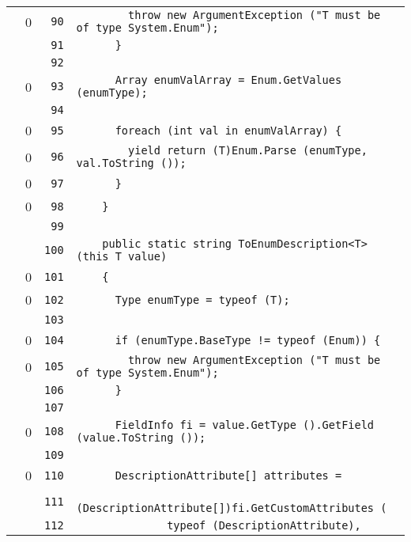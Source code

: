 \documentclass[a4paper,10pt]{article}
\begin{document}
\begin{longtable}[l]{lrrl}
\cellcolor{red} & 0 & \verb~90~ & \verb~        throw new ArgumentException ("T must be of type System.Enum");~\\
\cellcolor{gray} &  & \verb~91~ & \verb~      }~\\
\cellcolor{gray} &  & \verb~92~ & \verb~~\\
\cellcolor{red} & 0 & \verb~93~ & \verb~      Array enumValArray = Enum.GetValues (enumType);~\\
\cellcolor{gray} &  & \verb~94~ & \verb~~\\
\cellcolor{red} & 0 & \verb~95~ & \verb~      foreach (int val in enumValArray) {~\\
\cellcolor{red} & 0 & \verb~96~ & \verb~        yield return (T)Enum.Parse (enumType, val.ToString ());~\\
\cellcolor{red} & 0 & \verb~97~ & \verb~      }~\\
\cellcolor{red} & 0 & \verb~98~ & \verb~    }~\\
\cellcolor{gray} &  & \verb~99~ & \verb~~\\
\cellcolor{gray} &  & \verb~100~ & \verb~    public static string ToEnumDescription<T> (this T value)~\\
\cellcolor{red} & 0 & \verb~101~ & \verb~    {~\\
\cellcolor{red} & 0 & \verb~102~ & \verb~      Type enumType = typeof (T);~\\
\cellcolor{gray} &  & \verb~103~ & \verb~~\\
\cellcolor{red} & 0 & \verb~104~ & \verb~      if (enumType.BaseType != typeof (Enum)) {~\\
\cellcolor{red} & 0 & \verb~105~ & \verb~        throw new ArgumentException ("T must be of type System.Enum");~\\
\cellcolor{gray} &  & \verb~106~ & \verb~      }~\\
\cellcolor{gray} &  & \verb~107~ & \verb~~\\
\cellcolor{red} & 0 & \verb~108~ & \verb~      FieldInfo fi = value.GetType ().GetField (value.ToString ());~\\
\cellcolor{gray} &  & \verb~109~ & \verb~~\\
\cellcolor{red} & 0 & \verb~110~ & \verb~      DescriptionAttribute[] attributes =~\\
\cellcolor{gray} &  & \verb~111~ & \verb~          (DescriptionAttribute[])fi.GetCustomAttributes (~\\
\cellcolor{gray} &  & \verb~112~ & \verb~              typeof (DescriptionAttribute),~\\

\end{longtable}
\end{document}
